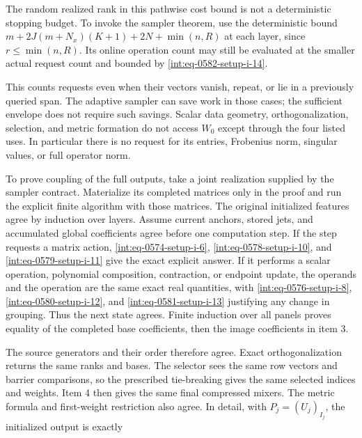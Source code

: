 
The random realized rank in this pathwise cost bound is not a deterministic stopping budget. To invoke the sampler theorem, use the deterministic bound \(m+2J(m+N_x)(K+1)+2N+\min(n,\allowbreak R)\) at each layer, since \(r\le\min(n,\allowbreak R)\). Its online operation count may still be evaluated at the smaller actual request count and bounded by \hyperref[int:eq-setup-i-14]{\eqref{int:eq-0582-setup-i-14}}.



This counts requests even when their vectors vanish, repeat, or lie in a previously queried span. The adaptive sampler can save work in those cases; the sufficient envelope does not require such savings. Scalar data geometry, orthogonalization, selection, and metric formation do not access \(W_0\) except through the four listed uses. In particular there is no request for its entries, Frobenius norm, singular values, or full operator norm.



To prove coupling of the full outputs, take a joint realization supplied by the sampler contract. Materialize its completed matrices only in the proof and run the explicit finite algorithm with those matrices. The original initialized features agree by induction over layers. Assume current anchors, stored jets, and accumulated global coefficients agree before one computation step. If the step requests a matrix action, \hyperref[int:eq-setup-i-6]{\eqref{int:eq-0574-setup-i-6}}, \hyperref[int:eq-setup-i-10]{\eqref{int:eq-0578-setup-i-10}}, and \hyperref[int:eq-setup-i-11]{\eqref{int:eq-0579-setup-i-11}} give the exact explicit answer. If it performs a scalar operation, polynomial composition, contraction, or endpoint update, the operands and the operation are the same exact real quantities, with \hyperref[int:eq-setup-i-8]{\eqref{int:eq-0576-setup-i-8}}, \hyperref[int:eq-setup-i-12]{\eqref{int:eq-0580-setup-i-12}}, and \hyperref[int:eq-setup-i-13]{\eqref{int:eq-0581-setup-i-13}} justifying any change in grouping. Thus the next state agrees. Finite induction over all panels proves equality of the completed base coefficients, then the image coefficients in item 3.



The source generators and their order therefore agree. Exact orthogonalization returns the same ranks and bases. The selector sees the same row vectors and barrier comparisons, so the prescribed tie-breaking gives the same selected indices and weights. Item 4 then gives the same final compressed mixers. The metric formula and first-weight restriction also agree. In detail, with \(P_j=(U_j)_{I_j}\), the initialized output is exactly


